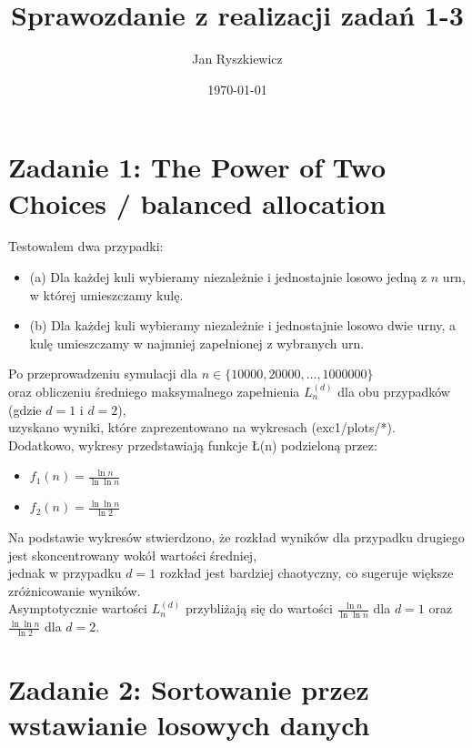 \documentclass{article}
\title{Sprawozdanie z realizacji zadań 1-3}
\author{Jan Ryszkiewicz}
\date{\today}
\begin{document}
\maketitle

\section*{Zadanie 1: The Power of Two Choices / balanced allocation}

Testowałem dwa przypadki:

\begin{itemize}
    \item (a) Dla każdej kuli wybieramy niezależnie i jednostajnie losowo jedną z \(n\) urn, w której umieszczamy kulę.
    \item (b) Dla każdej kuli wybieramy niezależnie i jednostajnie losowo dwie urny, a kulę umieszczamy w najmniej zapełnionej z wybranych urn.
\end{itemize}

Po przeprowadzeniu symulacji dla \(n \in \{10 000, 20 000, \dots, 1 000 000\}\) \\
oraz obliczeniu średniego maksymalnego zapełnienia \(L^{(d)}_n\) dla obu przypadków (gdzie \(d = 1\) i \(d = 2\)), \\
uzyskano wyniki, które zaprezentowano na wykresach (exc1/plots/*). \\
Dodatkowo, wykresy przedstawiają funkcje \L(n) podzieloną przez:
\begin{itemize}
    \item \(f_1(n) = \frac{\ln n}{\ln \ln n}\)
    \item \(f_2(n) = \frac{\ln \ln n}{\ln 2}\)
\end{itemize}

Na podstawie wykresów stwierdzono, że rozkład wyników dla przypadku drugiego jest skoncentrowany wokół wartości średniej, \\
jednak w przypadku \(d = 1\) rozkład jest bardziej chaotyczny, co sugeruje większe zróżnicowanie wyników. \\
Asymptotycznie wartości \(L^{(d)}_n\) przybliżają się do wartości \(\frac{\ln n}{\ln \ln n}\) dla \(d = 1\) oraz \(\frac{\ln \ln n}{\ln 2}\) dla \(d = 2\).\\

\section*{Zadanie 2: Sortowanie przez wstawianie losowych danych}
\end{document}
